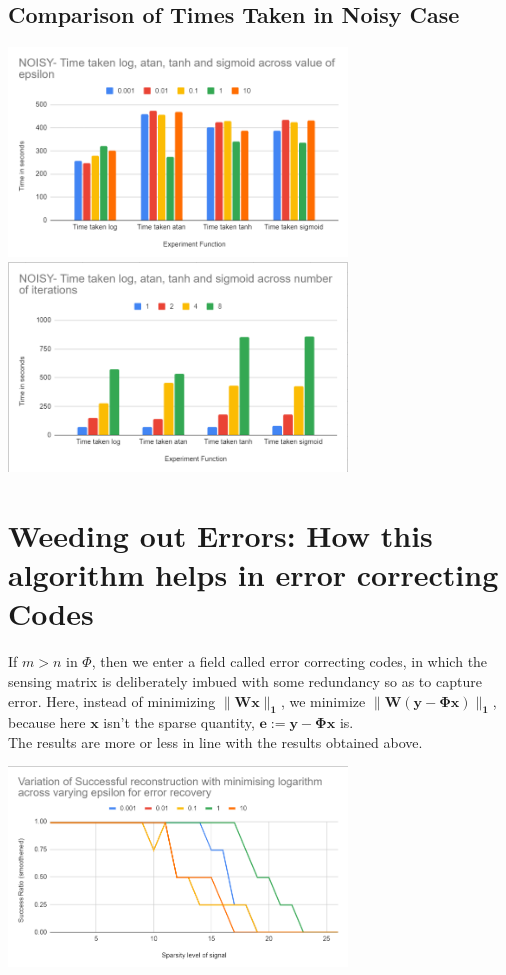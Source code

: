 \documentclass[a4paper,14pt]{article}
\numberwithin{definition}{section}
\numberwithin{mytheorem}{subsection}
\begin{document}
\subsection{Comparison of Times Taken in Noisy Case}

\begin{center}
    \includegraphics[width=9cm]{time_epsilon_noisy.png}
    \includegraphics[width=9cm]{time_iterations_noisy.png}
\end{center}

\section{Weeding out Errors: How this algorithm helps in error correcting Codes}
If $m > n$ in $\Phi$, then we enter a field called error correcting codes, in which the sensing matrix is deliberately imbued with some redundancy so as to capture error. Here, instead of minimizing $\boldsymbol{\lVert Wx\rVert_1}$, we minimize $\boldsymbol{\lVert W(y - \Phi x)\rVert_1}$, because here $\boldsymbol{x}$ isn't the sparse quantity, $\boldsymbol{e := y -\Phi x}$ is.\\
The results are more or less in line with the results obtained above.

\begin{center}
    \includegraphics[width=9cm]{Error_Recovery.png}
\end{center}
\end{document}
